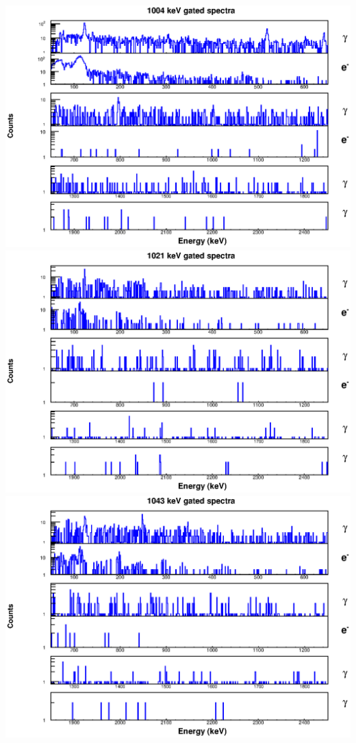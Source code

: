 \includegraphics[scale=0.8]{154Gd_Appendix/1004_combined.eps}
\includegraphics[scale=0.8]{154Gd_Appendix/1021_combined.eps}
\includegraphics[scale=0.8]{154Gd_Appendix/1043_combined.eps}
